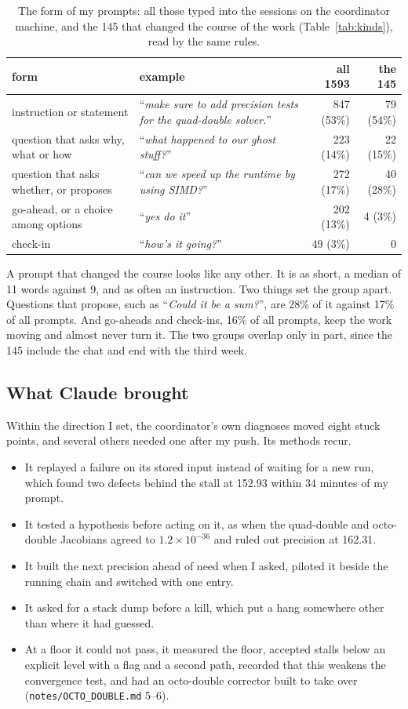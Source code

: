 \documentclass[aps,prd,onecolumn,superscriptaddress,nofootinbib,10pt]{revtex4-2}
\newcommand{\file}[1]{\texttt{#1}}
\newcommand{\prompt}[1]{``\textit{#1}''}
\begin{document}
\begin{table}[h]
\caption{The form of my prompts: all those typed into the sessions on the coordinator machine, and the 145 that changed
the course of the work (Table~\ref{tab:kinds}), read by the same rules.}
\label{tab:forms}
\small
\begin{tabular}{L{4.6cm}L{6.4cm}rr}
\toprule
form & example & all 1593 & the 145\\
\midrule
instruction or statement & \prompt{make sure to add precision tests for the quad-double solver.} & 847 (53\%) & 79 (54\%)\\
question that asks why, what or how & \prompt{what happened to our ghost stuff?} & 223 (14\%) & 22 (15\%)\\
question that asks whether, or proposes & \prompt{can we speed up the runtime by using SIMD?} & 272 (17\%) & 40 (28\%)\\
go-ahead, or a choice among options & \prompt{yes do it} & 202 (13\%) & 4 (3\%)\\
check-in & \prompt{how's it going?} & 49 (3\%) & 0\\
\bottomrule
\end{tabular}
\end{table}

A prompt that changed the course looks like any other. It is as short, a median of 11 words against 9, and as often an
instruction. Two things set the group apart. Questions that propose, such as \prompt{Could it be a sum?}, are 28\% of it
against 17\% of all prompts. And go-aheads and check-ins, 16\% of all prompts, keep the work moving and almost never
turn it. The two groups overlap only in part, since the 145 include the chat and end with the third week.

\subsection{What Claude brought}

Within the direction I set, the coordinator's own diagnoses moved eight stuck points, and several others needed one after
my push. Its methods recur.
\begin{itemize}
\item It replayed a failure on its stored input instead of waiting for a new run, which found two defects behind the stall
at 152.93 within 34 minutes of my prompt.
\item It tested a hypothesis before acting on it, as when the quad-double and octo-double Jacobians agreed to
$1.2\times10^{-36}$ and ruled out precision at 162.31.
\item It built the next precision ahead of need when I asked, piloted it beside the running chain and switched with one
entry.
\item It asked for a stack dump before a kill, which put a hang somewhere other than where it had guessed.
\item At a floor it could not pass, it measured the floor, accepted stalls below an explicit level with a flag and a
second path, recorded that this weakens the convergence test, and had an octo-double corrector built to take over
(\file{notes/OCTO\_DOUBLE.md} 5--6).
\end{itemize}
\end{document}
